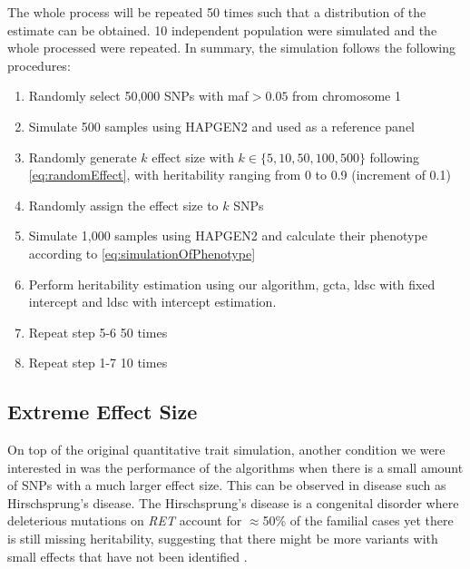 			The whole process will be repeated 50 times such that a distribution of the estimate can be obtained.
			10 independent population were simulated and the whole processed were repeated.
			In summary, the simulation follows the following procedures:
			\begin{enumerate}
				\item Randomly select 50,000 \glspl{SNP} with \gls{maf}$>0.05$ from chromosome 1
				\item Simulate 500 samples using HAPGEN2 and used as a reference panel
				\item Randomly generate $k$ effect size with $k \in \{5,10,50,100,500\}$ following \cref{eq:randomEffect}, with heritability ranging from 0 to 0.9 (increment of 0.1)
				\item Randomly assign the effect size to $k$ \glspl{SNP}
				\item Simulate 1,000 samples using HAPGEN2 and calculate their phenotype according to \cref{eq:simulationOfPhenotype}
				\item Perform heritability estimation using our algorithm, \gls{gcta}, \gls{ldsc} with fixed intercept and \gls{ldsc} with intercept estimation.
				\item Repeat step 5-6 50 times
				\item Repeat step 1-7 10 times
			\end{enumerate}
		
		\subsection{Extreme Effect Size}
		On top of the original quantitative trait simulation, another condition we were interested in was the performance of the algorithms when there is a small amount of \glspl{SNP} with a much larger effect size.
		This can be observed in disease such as Hirschsprung's disease.
		The Hirschsprung's disease is a congenital disorder where deleterious mutations on \textit{RET} account for $\approx$50\% of the familial cases yet there is still missing heritability, suggesting that there might be more variants with small effects that have not been identified \citep{Gui2013}.
		
